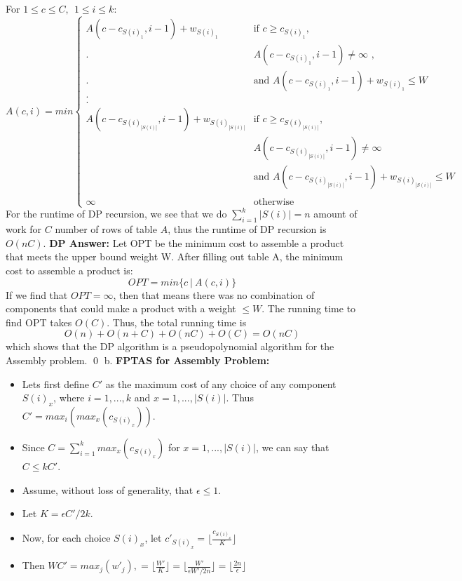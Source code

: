 \documentclass[oneside]{homework} %
\begin{document}
\newline
\newline
For $1 \leq c \leq C, \ \ 1 \leq i \leq k$:
\begin{equation*}
  A(c,i) = min
  \begin{cases}
    A(c-c_{S(i)_1}, i-1) + w_{S(i)_1} & \text{if $c \geq c_{S(i)_1}$,} \\
    . & \text{$A(c-c_{S(i)_1}, i-1) \neq \infty$ ,} \\
    . & \text{and $A(c-c_{S(i)_1}, i-1) + w_{S(i)_1} \leq W$} \\
    . \\
    . \\
    A(c-c_{S(i)_{|S(i)|}}, i-1) + w_{S(i)_{|S(i)|}} & \text{if $c \geq c_{S(i)_{|S(i)|}}$,} \\
     & \text{$A(c-c_{S(i)_{|S(i)|}}, i-1) \neq \infty$} \\
     & \text{and $A(c-c_{S(i)_{|S(i)|}}, i-1) + w_{S(i)_{|S(i)|}} \leq W$} \\
     \\
    \infty & \text{otherwise}
  \end{cases}
\end{equation*}
\newline
For the runtime of DP recursion, we see that we do $\sum\limits_{i=1}^{k}|S(i)| = n$ amount of work for $C$ number of rows of table $A$, thus the runtime of DP recursion is $O(nC)$.
\newline
\newline 
\textbf{DP Answer:}
\newline
Let OPT be the minimum cost to assemble a product that meets the upper bound weight W. After filling out table A, the minimum cost to assemble a product is: $$OPT = min\{ c \ | \ A(c,i) \}$$ If we find that $OPT = \infty$, then that means there was no combination of components that could make a product with a weight $\leq W$. The running time to find OPT takes $O(C)$. Thus, the total running time is $$O(n) + O(n + C) + O(nC) + O(C) = O(nC)$$ which shows that the DP algorithm is a pseudopolynomial algorithm for the Assembly problem. \hfill\qed
\newline
\newline
{\large b.} \textbf{FPTAS for Assembly Problem:}
\begin{itemize}
  \item Lets first define $C'$ as the maximum cost of any choice of any component $S(i)_x$, where $i = 1,...,k$ and $x = 1,...,|S(i)|$. Thus $C' = max_i(max_x(c_{S(i)_x}))$.
  \item Since $C = \sum\limits_{i=1}^{k}max_x(c_{S(i)_x})$ for $x = 1,...,|S(i)|$, we can say that $C \leq kC'$.
  \item Assume, without loss of generality, that $\epsilon \leq 1$.
  \item Let $K = \epsilon C' / 2k$.
  \item Now, for each choice $S(i)_x$, let $c'_{S(i)_x} = \lfloor\frac{c_{S(i)_x}}{K}\rfloor$
  \item Then $WC' = max_j(w'_j) ,= \lfloor\frac{W'}{K}\rfloor = \lfloor\frac{W'}{\epsilon W'/2n}\rfloor = \lfloor\frac{2n}{\epsilon}\rfloor$
\end{itemize}
\end{document}
